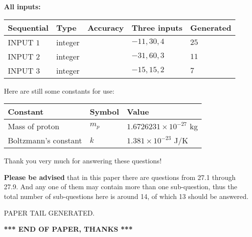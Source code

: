 \documentclass[12pt]{article}
\begin{document}
   
   
   
\noindent\vspace{0.1in}\hspace{-0.08in} {\textbf{\Large{All inputs: }}}
   
   
  
  
\noindent\begin{tabular}{|l|l|l|l|l|}
\hline
 Sequential & Type & Accuracy & Three inputs & Generated \\ 
\hline
 
 
  INPUT $            1 $ & integer &  & $
 -11
 , 
 30
 , 
 4
 $ & $ 25 $ 
 \\  \hline  
 
 
  INPUT $            2 $ & integer &  & $
 -31
 , 
 60
 , 
 3
 $ & $ 11 $ 
 \\  \hline  
 
 
  INPUT $            3 $ & integer &  & $
 -15
 , 
 15
 , 
 2
 $ & $ 7 $ 
 \\  \hline  
 \end{tabular}
   
   
   
   
   
   
 \vspace{0.2in}
Here are still some constants for use:
 
 
\noindent\begin{tabular}{|l|l|l|}
\hline
Constant & Symbol & Value \\
\hline
 
Mass of proton &
$m_p$ &
 $ 1.6726231 \times 10^{-27} $
kg \\
\hline
 
Boltzmann's constant &
$k$ &
 $ 1.381 \times 10^{-23} $
J/K \\
\hline
 
\end{tabular}
 
Thank you very much for answering these questions!
 
{\textbf{\large{Please be advised}}} that in this paper there are questions from
27.1 through
27.9.
And any one of them may contain more than one sub-question, thus the total number
of sub-questions here is around 14, of which
13 should be answered.
 
   
   
\vspace{2.0in} PAPER TAIL GENERATED.
   
   
   
   
\vspace{1.0in} 
{\textbf{\large{ *** END OF PAPER, THANKS *** }}} 
   
\end{document}
